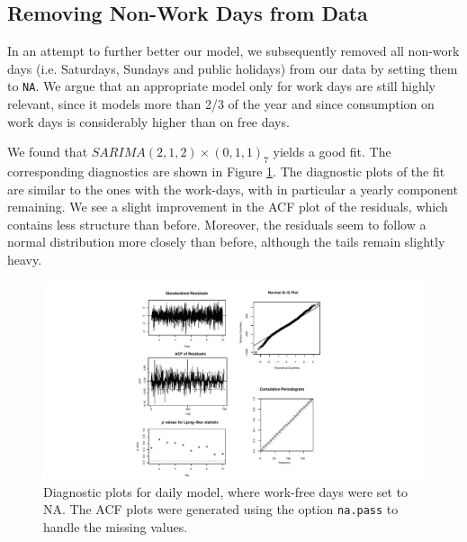 \documentclass[conference]{IEEEtran}
\begin{document}
\subsection{Removing Non-Work Days from Data}
In an attempt to further better our model, we subsequently removed all non-work days (i.e. Saturdays, Sundays and public holidays) from our data by setting them to \texttt{NA}. We argue that an appropriate model only for work days are still highly relevant, since it models more than 2/3 of the year and since consumption on work days is considerably higher than on free days. 
\par
We found that $SARIMA(2, 1, 2) \times (0, 1, 1)_7$ yields a good fit. The corresponding diagnostics are shown in Figure \ref{daily_nowe}. The diagnostic plots of the fit are similar to the ones with the work-days, with in particular a yearly component remaining. We see a slight improvement in the ACF plot of the residuals, which contains less structure than before. Moreover, the residuals seem to follow a normal distribution more closely than before, although the tails remain slightly heavy.

\begin{figure}[ht]
	\centering
	\includegraphics[width=1\textwidth]{Figs/Fig7.pdf}
	\caption{Diagnostic plots for daily model, where work-free days were set to NA. The ACF plots were generated using the option \texttt{na.pass} to handle the missing values.}
	\label{daily_nowe}
\end{figure}
\end{document}
